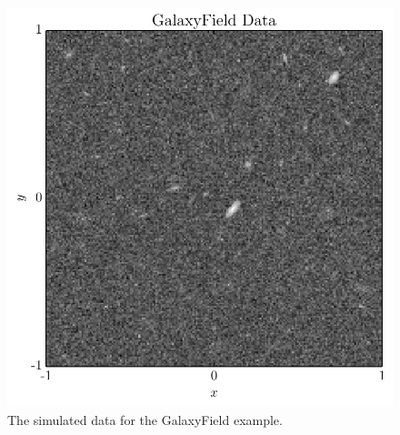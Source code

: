 \documentclass[letterpaper, 11pt]{article}
\begin{document}
\begin{figure}
\begin{center}
\includegraphics[scale=0.7]{galaxyfield_data.pdf}
\caption{The simulated data for the GalaxyField example.
\label{fig:galaxyfield_data}}
\end{center}
\end{figure}
\end{document}

